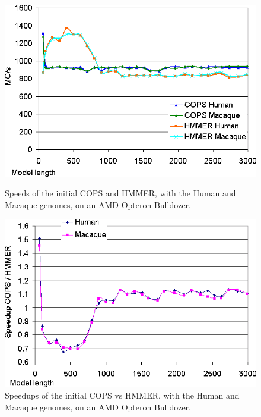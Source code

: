 \begin{figure}[h!]
    \begin{minipage}{0.48\linewidth}
		\centering
		\includegraphics[scale=0.46]{graphics/initial-aleph-runtimes.png}
		\caption[Speeds for the Inter-task vectorization on an AMD Opteron Bulldozer] 
		{Speeds of the initial COPS and HMMER, with the Human and Macaque genomes, on an AMD Opteron Bulldozer.}
		\label{initial-aleph-runtimes}
    \end{minipage}
    \hspace{0.04\linewidth}
    \begin{minipage}{0.48\linewidth}
		\centering
		\includegraphics[scale=0.46]{graphics/initial-aleph-speedups.png}
		\caption[Speedups for the Inter-task vectorization on an AMD Opteron Bulldozer] 
		{Speedups of the initial COPS vs HMMER, with the Human and Macaque genomes, on an AMD Opteron Bulldozer.}
		\label{initial-aleph-speedups}
    \end{minipage}
\end{figure} 

